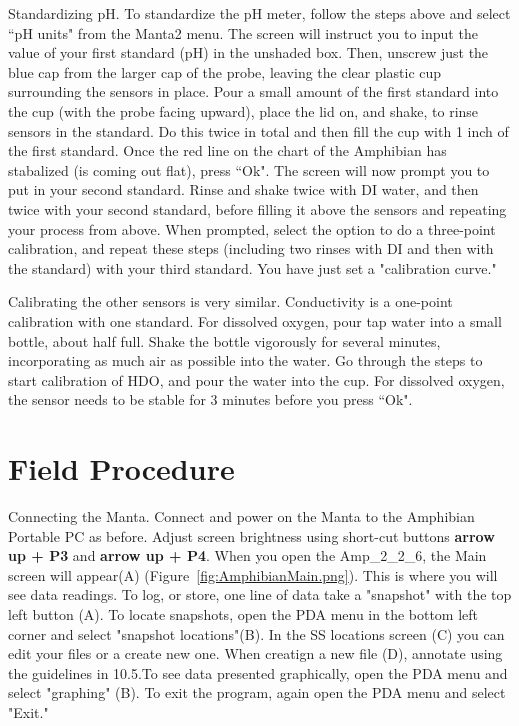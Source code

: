 \documentclass[12pt]{../SOP3_beta}\usepackage[]{graphicx}\usepackage[]{color}
\begin{document}
\NP Standardizing pH. To standardize the pH meter, follow the steps above and select ``pH units" from the Manta2 menu. The screen will instruct you to input the value of your first standard (pH) in the unshaded box. Then, unscrew just the blue cap from the larger cap of the probe, leaving the clear plastic cup surrounding the sensors in place. Pour a small amount of the first standard into the cup (with the probe facing upward), place the lid on, and shake, to rinse sensors in the standard. Do this twice in total and then fill the cup with 1 inch of the first standard. Once the red line on the chart of the Amphibian has stabalized (is coming out flat), press ``Ok". The screen will now prompt you to put in your second standard. Rinse and shake twice with DI water, and then twice with your second standard, before filling it above the sensors and repeating your process from above. When prompted, select the option to do a three-point calibration, and repeat these steps (including two rinses with DI and then with the standard) with your third standard. You have just set a "calibration curve."

\NP Calibrating the other sensors is very similar. Conductivity is a one-point calibration with one standard. For dissolved oxygen, pour tap water into a small bottle, about half full. Shake the bottle vigorously for several minutes, incorporating as much air as possible into the water. Go through the steps to start calibration of HDO, and pour the water into the cup. For dissolved oxygen, the sensor needs to be stable for 3 minutes before you press ``Ok". 

\section{Field Procedure}

\NP Connecting the Manta. Connect and power on the Manta to the Amphibian Portable PC as before. Adjust screen brightness using short-cut buttons \textbf{arrow up + P3} and \textbf{arrow up + P4}. When you open the Amp\_2\_2\_6, the Main screen will appear(A) (Figure~\ref{fig:AmphibianMain.png}). This is where you will see data readings. To log, or store, one line of data take a "snapshot" with the top left button (A). To locate snapshots, open the PDA menu in the bottom left corner and select "snapshot locations"(B). In the SS locations screen (C) you can edit your files or a create new one. When creatign a new file (D), annotate using the guidelines in 10.5.To see data presented graphically, open the PDA menu and select "graphing" (B). To exit the program, again open the PDA menu and select "Exit."
\end{document}
